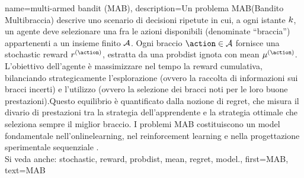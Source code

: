 {name={multi-armed bandit (MAB)},
	description={Un problema MAB(Bandito Multibraccia) descrive uno scenario di decisioni 
	ripetute in cui, a ogni istante $k$, un agente deve selezionare una fra le azioni disponibili (denominate “braccia”) 
	appartenenti a un insieme finito $\mathcal{A}$. 
	Ogni braccio $\action\in\actionset$ fornisce una \gls{stochastic} \gls{reward} $\reward^{(\action)}$, 
	estratta da una \gls{probdist} ignota con \gls{mean} $\mu^{(\action)}$.
		L'obiettivo dell'agente è massimizzare nel tempo la \gls{reward} cumulativa, bilanciando strategicamente 
		l’esplorazione (ovvero la raccolta di informazioni sui bracci incerti) e l’utilizzo (ovvero la selezione dei bracci noti 
		per le loro buone prestazioni).Questo equilibrio è quantificato dalla nozione di \gls{regret}, che misura il divario di 
		prestazioni tra la strategia dell’apprendente e la strategia ottimale che seleziona sempre il miglior braccio.
		I problemi MAB costituiscono un \gls{model} fondamentale nell'\gls{onlinelearning}, nel reinforcement learning e 
		nella progettazione sperimentale sequenziale \cite{Bubeck2012}.
					\\ 
		Si veda anche: \gls{stochastic}, \gls{reward}, \gls{probdist}, \gls{mean}, \gls{regret}, \gls{model}.},
	first={MAB},
	text={MAB}
}



